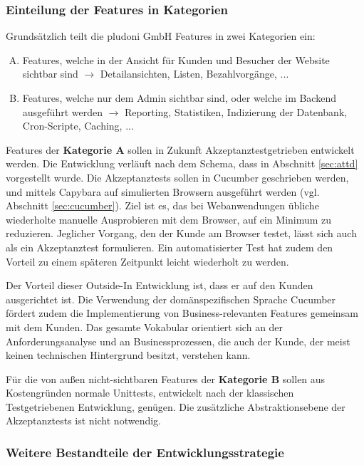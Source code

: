 \subsubsection{Einteilung der Features in Kategorien}
Grundsätzlich teilt die pludoni GmbH Features in zwei Kategorien ein:

\begin{enumerate}[A.]

 \item Features, welche in der Ansicht für Kunden und Besucher der Website sichtbar sind $\to$ Detailansichten, Listen, Bezahlvorgänge, ...
 \item Features, welche nur dem Admin sichtbar sind, oder welche im Backend ausgeführt werden $\to$ Reporting, Statistiken, Indizierung der Datenbank, Cron-Scripte, Caching, ...
\end{enumerate}

Features der \textbf{Kategorie A} sollen in Zukunft Akzeptanztestgetrieben entwickelt werden. Die Entwicklung verläuft nach dem Schema, dass in Abschnitt \ref{sec:attd} vorgestellt wurde. Die Akzeptanztests sollen in Cucumber geschrieben werden, und mittels Capybara auf simulierten Browsern ausgeführt werden (vgl. Abschnitt \ref{sec:cucumber}).
Ziel ist es, das bei Webanwendungen übliche wiederholte manuelle Ausprobieren mit dem Browser, auf ein Minimum zu reduzieren. Jeglicher Vorgang, den der Kunde am Browser testet, lässt sich auch als ein Akzeptanztest formulieren. Ein automatisierter Test hat zudem den Vorteil zu einem späteren Zeitpunkt leicht wiederholt zu werden.

Der Vorteil dieser Outside-In Entwicklung ist, dass er auf den Kunden ausgerichtet ist. Die Verwendung der domänspezifischen Sprache Cucumber fördert zudem die Implementierung von Business-relevanten Features gemeinsam mit dem Kunden. Das gesamte Vokabular orientiert sich an der Anforderungsanalyse und an Businessprozessen, die auch der Kunde, der meist keinen technischen Hintergrund besitzt, verstehen kann.

Für die von außen nicht-sichtbaren Features der \textbf{Kategorie B} sollen aus Kostengründen normale Unittests, entwickelt nach der klassischen Testgetriebenen Entwicklung, genügen. Die zusätzliche Abstraktionsebene der Akzeptanztests ist nicht notwendig.

\subsubsection{Weitere Bestandteile der Entwicklungsstrategie}
\label{sec:auswahlWeitere}

